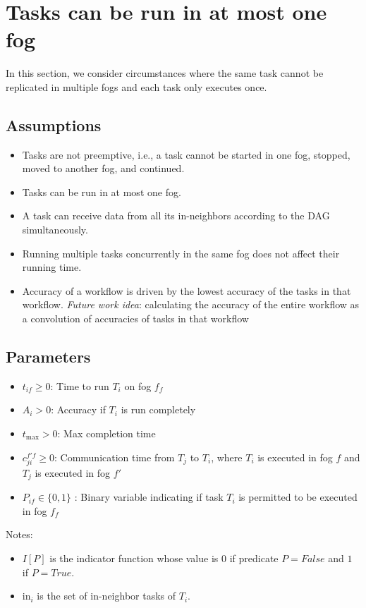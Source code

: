 \section{Tasks can be run in at most one fog }
In this section, we consider circumstances where the same task cannot be replicated in multiple fogs and each task only executes once. 

\subsection{Assumptions}
\begin{itemize}
    \item Tasks are not preemptive, i.e., a task cannot be started in one fog, stopped, moved to another fog, and continued.
    \item Tasks can be run in at most one fog.
    \item A task can receive data from all its in-neighbors  according to the DAG simultaneously.
    \item Running multiple tasks concurrently in the same fog does not affect their running time.
    \item Accuracy of a workflow is driven by the lowest accuracy of the tasks in that workflow. \textit{Future work idea}: calculating the accuracy of the entire workflow as a convolution of accuracies of tasks in that workflow 
\end{itemize}


\subsection{Parameters}
\begin{itemize}
    \item $t_{if} \geq 0$: Time to run $T_i$ on fog $f_f$
    \item $A_i > 0$: Accuracy if $T_i$ is run completely
    \item $t_{\max} >0$: Max completion time
    \item $c_{ji}^{f'f} \geq 0$: Communication time from $T_j$ to $T_i$, where $T_i$ is executed in fog $f$ and $T_j$ is executed in fog $f'$
    \item $P_{if} \in \{0,1\}$ : Binary variable indicating if task $T_i$ is permitted to be executed in fog $f_f$ 
\end{itemize}
Notes: 
\begin{itemize}
    \item $I[P]$ is the indicator function whose value is $0$ if predicate $P=False$ and $1$ if $P=True$.
    \item $\text{in}_i$ is the set of in-neighbor tasks of $T_i$.
\end{itemize}

